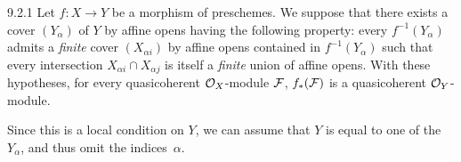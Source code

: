 
\begin{env}[Proposition]{9.2.1}
\label{prop-1.9.2.1}
Let $f\colon X\to Y$ be a morphism of
preschemes.  We suppose that there exists a cover $(Y_\alpha)$ of $Y$ by affine
opens having the following property: every $f^{-1}(Y_\alpha)$ admits a
\emph{finite} cover $(X_{\alpha i})$ by affine opens contained in
$f^{-1}(Y_\alpha)$ such that every intersection $X_{\alpha i}\cap X_{\alpha j}$
is itself a \emph{finite} union of affine opens.  With these hypotheses, for
every quasicoherent $\mathcal{O}_X$-module $\mathcal{F}$, $f_\ast(\mathcal{F})$ is a
quasicoherent $\mathcal{O}_Y$-module.
\end{env}

Since this is a local condition on $Y$, we can assume that $Y$ is equal to one
of the $Y_\alpha$, and thus omit the indices~$\alpha$.

